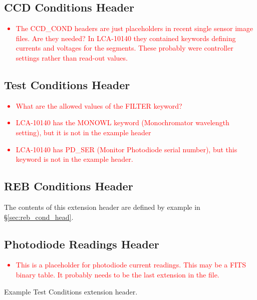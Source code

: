 \documentclass{article}[12pt]
\newcommand{\red}{\textcolor{red}}
\begin{document}
{\subsection{CCD Conditions Header}

\red{
\begin{itemize}
\item{The CCD\_COND headers are just placeholders in recent single sensor image files.  Are they needed?  In LCA-10140 they contained keywords defining currents and voltages for the segments.  These probably were controller settings rather than read-out values.}
\end{itemize}
}

\subsection{Test Conditions Header}

\red{
\begin{itemize}
\item{What are the allowed values of the FILTER keyword?}
\item{LCA-10140 has the MONOWL keyword (Monochromator wavelength setting), but it is not in the example header}
\item{LCA-10140 has PD\_SER (Monitor Photodiode serial number), but this keyword is not in the example header.}
\end{itemize}
}

\subsection{REB Conditions Header}

The contents of this extension header are defined by example in \S \ref{sec:reb_cond_head}.


\subsection{Photodiode Readings Header}

\red{
\begin{itemize}
\item{This is a placeholder for photodiode current readings.  This may be a FITS binary table.  It probably needs to be the last extension in the file.}
\end{itemize}
}

\begin{table}
\begin{alltt}

\end{alltt}
\caption{Example Test Conditions extension header.\label{table:test_cond}}
\end{table}

}
\end{document}

